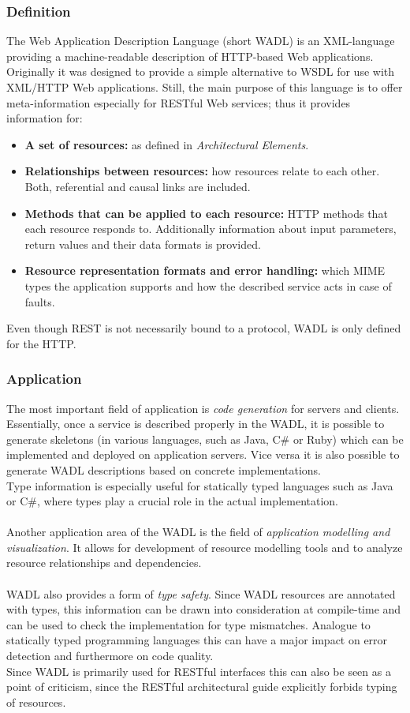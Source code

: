 \subsubsection*{Definition}
The Web Application Description Language (short WADL) is an XML-language providing a machine-readable description of HTTP-based  Web applications. Originally it was designed to provide a simple alternative to WSDL for use with XML/HTTP Web applications. Still, the main purpose of this language is to offer meta-information especially for RESTful Web services; thus it provides information for: 
\begin{itemize}
\item{{\bf A set of resources:} as defined in \emph{Architectural Elements}.}
\item{{\bf Relationships between resources:} how resources relate to each other. Both, referential and causal links are included.}
\item{{\bf Methods that can be applied to each resource:} HTTP methods that each resource responds to. Additionally information about input parameters, return values and their data formats is provided.}
\item{{\bf Resource representation formats and error handling:} which MIME types the application supports and how the described service acts in case of faults. \cite{WADL}}
\end{itemize}
Even though REST is not necessarily bound to a protocol, WADL is only defined for the HTTP.
\subsubsection*{Application}
The most important field of application is \emph{code generation} for servers and clients. Essentially, once a service is described properly in the WADL, it is possible to generate skeletons (in various languages, such as Java, C\# or Ruby) which can be implemented and deployed on application servers. Vice versa it is also possible to generate WADL descriptions based on concrete implementations.
\\
Type information is especially useful for statically typed languages such as Java or C\#, where types play a crucial role in the actual implementation.
\\ \\
Another application area of the WADL is the field of \emph{application modelling and visualization}. It allows for development of resource modelling tools and to analyze resource relationships and dependencies. \cite{WADL}
\\ \\
WADL also provides a form of \emph{type safety}. Since WADL resources are annotated with types, this information can be drawn into consideration at compile-time and can be used to check the implementation for type mismatches. Analogue to statically typed programming languages this can have a major impact on error detection and furthermore on code quality.
\\
Since WADL is primarily used for RESTful interfaces this can also be seen as a point of criticism, since the RESTful architectural guide explicitly forbids typing of resources.

